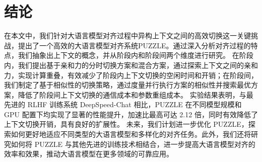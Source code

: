 \section{结论}
在本文中，我们针对大语言模型对齐过程中异构上下文之间的高效切换这一关键挑战，提出了一个高效的大语言模型对齐系统PUZZLE。通过深入分析对齐过程的特点，我们抽象出上下文的概念，并从阶段内和阶段间两个维度进行研究。
在阶段内，我们提出基于亲和力的分时切换方案和混合方案，通过探索上下文之间的亲和力，实现计算重叠，有效减少了阶段内上下文切换的空闲时间和开销；在阶段间，我们制定了基于相似性的切换策略，通过度量并行执行方案的相似性并搜索最优方案，降低了阶段间上下文切换的通信成本和参数重组成本。
实验结果表明，与最先进的 RLHF 训练系统 DeepSpeed-Chat 相比，PUZZLE 在不同模型规模和 GPU 配置下均实现了显著的性能提升，加速比最高可达 2.12 倍，同时有效降低了上下文切换开销，具有良好的扩展性。
未来，我们计划进一步优化 PUZZLE，探索如何更好地适应不同类型的大语言模型和多样化的对齐任务。此外，我们还将研究如何将 PUZZLE 与其他先进的训练技术相结合，进一步提高大语言模型对齐的效率和效果，推动大语言模型在更多领域的可靠应用。

